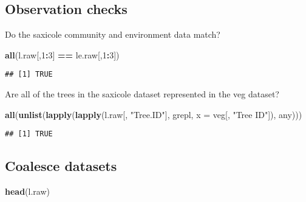 \documentclass[]{article}
\newenvironment{Shaded}{\begin{snugshade}}{\end{snugshade}}
\newcommand{\KeywordTok}[1]{\textcolor[rgb]{0.13,0.29,0.53}{\textbf{#1}}}
\newcommand{\DataTypeTok}[1]{\textcolor[rgb]{0.13,0.29,0.53}{#1}}
\newcommand{\DecValTok}[1]{\textcolor[rgb]{0.00,0.00,0.81}{#1}}
\newcommand{\StringTok}[1]{\textcolor[rgb]{0.31,0.60,0.02}{#1}}
\newcommand{\OperatorTok}[1]{\textcolor[rgb]{0.81,0.36,0.00}{\textbf{#1}}}
\newcommand{\NormalTok}[1]{#1}
\begin{document}
\subsection{Observation checks}\label{observation-checks}

Do the saxicole community and environment data match?

\begin{Shaded}
\begin{Highlighting}[]
\KeywordTok{all}\NormalTok{(l.raw[,}\DecValTok{1}\OperatorTok{:}\DecValTok{3}\NormalTok{] }\OperatorTok{==}\StringTok{ }\NormalTok{le.raw[,}\DecValTok{1}\OperatorTok{:}\DecValTok{3}\NormalTok{])}
\end{Highlighting}
\end{Shaded}

\begin{verbatim}
## [1] TRUE
\end{verbatim}

Are all of the trees in the saxicole dataset represented in the veg
dataset?

\begin{Shaded}
\begin{Highlighting}[]
\KeywordTok{all}\NormalTok{(}\KeywordTok{unlist}\NormalTok{(}\KeywordTok{lapply}\NormalTok{(}\KeywordTok{lapply}\NormalTok{(l.raw[, }\StringTok{"Tree.ID"}\NormalTok{], grepl, }\DataTypeTok{x =}\NormalTok{ veg[, }\StringTok{"Tree ID"}\NormalTok{]), any)))}
\end{Highlighting}
\end{Shaded}

\begin{verbatim}
## [1] TRUE
\end{verbatim}

\subsection{Coalesce datasets}\label{coalesce-datasets}

\begin{Shaded}
\begin{Highlighting}[]
\KeywordTok{head}\NormalTok{(l.raw)}
\end{Highlighting}
\end{Shaded}
\end{document}
